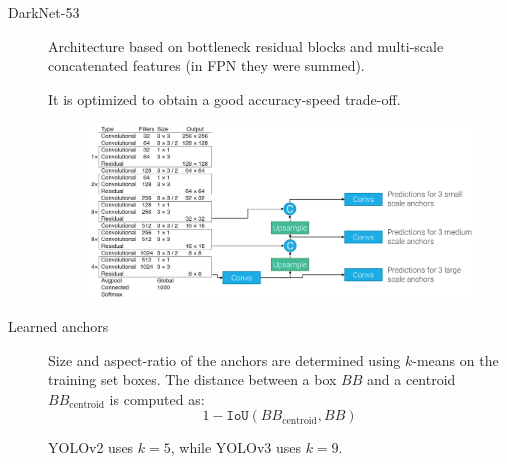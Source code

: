 \begin{description}
        \begin{description}
            \item[DarkNet-53]
                Architecture based on bottleneck residual blocks and multi-scale concatenated features (in FPN they were summed).

                It is optimized to obtain a good accuracy-speed trade-off.

                \begin{figure}[H]
                    \centering
                    \includegraphics[width=0.8\linewidth]{./img/_darknet.pdf}
                \end{figure}

            \item[Learned anchors] 
                Size and aspect-ratio of the anchors are determined using $k$-means on the training set boxes. The distance between a box $BB$ and a centroid $BB_\text{centroid}$ is computed as:
                \[ 1 - \texttt{IoU}(BB_\text{centroid}, BB) \]

                \begin{remark}
                    YOLOv2 uses $k=5$, while YOLOv3 uses $k=9$.
                \end{remark}
        \end{description}
\end{description}

